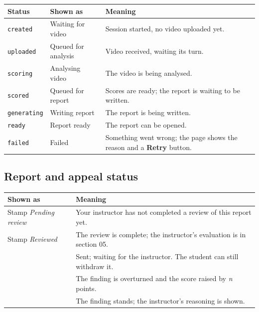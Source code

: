 \documentclass[11pt,a4paper]{article}
\newcommand{\ui}[1]{\textbf{\color{brand}\nohyphens{#1}}} %
\begin{document}
\begin{center}
\small
\begin{tabularx}{0.95\linewidth}{@{}l l Y@{}}
\toprule
\textbf{Status} & \textbf{Shown as} & \textbf{Meaning} \\
\midrule
\texttt{created} & Waiting for video & Session started, no video uploaded yet. \\
\texttt{uploaded} & Queued for analysis & Video received, waiting its turn. \\
\texttt{scoring} & Analysing video & The video is being analysed. \\
\texttt{scored} & Queued for report & Scores are ready; the report is waiting to be written. \\
\texttt{generating} & Writing report & The report is being written. \\
\texttt{ready} & Report ready & The report can be opened. \\
\texttt{failed} & Failed & Something went wrong; the page shows the reason and a \ui{Retry} button. \\
\bottomrule
\end{tabularx}
\end{center}

\subsection{Report and appeal status}
\begin{center}
\small
\begin{tabularx}{0.95\linewidth}{@{}l Y@{}}
\toprule
\textbf{Shown as} & \textbf{Meaning} \\
\midrule
Stamp \emph{Pending review} & Your instructor has not completed a review of this report yet. \\
Stamp \emph{Reviewed} & The review is complete; the instructor's evaluation is in section 05. \\
 & Sent; waiting for the instructor. The student can still withdraw it. \\
 & The finding is overturned and the score raised by \emph{n} points. \\
 & The finding stands; the instructor's reasoning is shown. \\
\bottomrule
\end{tabularx}
\end{center}
\end{document}
